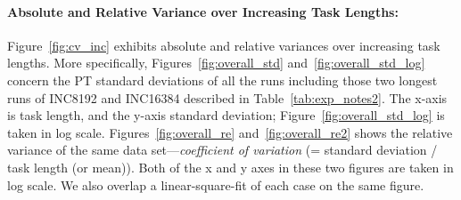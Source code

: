 \clearpage
\pagebreak

\paragraph{Absolute and Relative Variance over Increasing Task Lengths:}
Figure~\ref{fig:cv_inc} exhibits absolute and relative variances over increasing task lengths. 
More specifically, Figures~\ref{fig:overall_std} and~\ref{fig:overall_std_log} 
concern the PT standard deviations of all the runs including those two longest runs of INC8192 and INC16384 described in Table~\ref{tab:exp_notes2}. 
The x-axis is task length, and the y-axis standard deviation; Figure~\ref{fig:overall_std_log} is taken in log scale.
Figures~\ref{fig:overall_re} and~\ref{fig:overall_re2} shows 
the relative variance of the same data set---{\em coefficient of variation} (= standard deviation 
/ task length (or mean)). Both of the x and y axes in these two figures are taken in log scale. 
We also overlap a linear-square-fit of each case on the same figure. 

